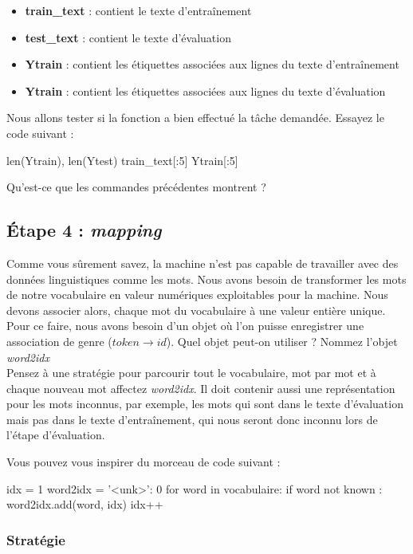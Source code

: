 \begin{itemize}
	\item \textbf{train\_text} : contient le texte d’entraînement
	\item \textbf{test\_text} : contient le texte d'évaluation
	\item \textbf{Ytrain} : contient les étiquettes associées aux lignes du texte d'entraînement
	\item \textbf{Ytrain} : contient les étiquettes associées aux lignes du texte d'évaluation
\end{itemize}

Nous allons tester si la fonction a bien effectué la tâche demandée. Essayez le code suivant :
\begin{python}
len(Ytrain), len(Ytest)
train_text[:5]
Ytrain[:5]
\end{python}
Qu'est-ce que les commandes précédentes montrent ?

\subsection{Étape 4 : \textit{mapping}}

Comme vous sûrement savez, la machine n'est pas capable de travailler avec des données linguistiques comme les mots. Nous avons besoin de transformer les mots de notre vocabulaire en valeur numériques exploitables pour la machine.
Nous devons associer alors, chaque mot du vocabulaire à une valeur entière unique. Pour ce faire, nous avons besoin d'un objet où l'on puisse enregistrer une association de genre (${token \rightarrow id}$).
Quel objet peut-on utiliser ? Nommez l'objet \textit{word2idx}\\

Pensez à une stratégie pour parcourir tout le vocabulaire, mot par mot et à chaque nouveau mot affectez \textit{word2idx}. Il doit contenir aussi une représentation pour les mots inconnus, par exemple, les mots qui sont dans le texte d'évaluation mais pas dans le texte d'entraînement, qui nous seront donc inconnu lors de l'étape d'évaluation.

Vous pouvez vous inspirer du morceau de code suivant :

\begin{python}
idx = 1
word2idx = {'<unk>': 0}
for word in vocabulaire:
 if word not known :
  word2idx.add(word, idx)
  idx++
\end{python}

\subsubsection{Stratégie}

